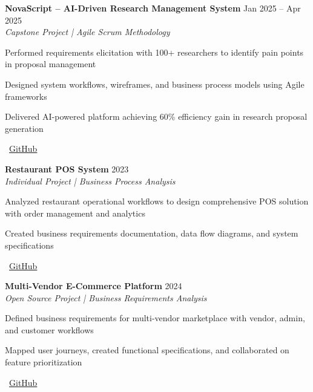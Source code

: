\documentclass[letterpaper,10pt]{article}
\newenvironment{resume_list}{
  \vspace{-2pt}
  \begin{itemize}[itemsep=1pt, leftmargin=14pt]
}{
  \end{itemize}\vspace{-3pt}
}
\begin{document}
\textbf{NovaScript – AI-Driven Research Management System} \hfill Jan 2025 – Apr 2025\\
\textit{Capstone Project | Agile Scrum Methodology}\\
\begin{resume_list}
  \item Performed requirements elicitation with 100+ researchers to identify pain points in proposal management
  \item Designed system workflows, wireframes, and business process models using Agile frameworks
  \item Delivered AI-powered platform achieving 60\% efficiency gain in research proposal generation
  \item \faGithub~\href{https://github.com/Chandima0406/NovaScript.git}{GitHub}
\end{resume_list}

\textbf{Restaurant POS System} \hfill 2023\\
\textit{Individual Project | Business Process Analysis}\\
\begin{resume_list}
  \item Analyzed restaurant operational workflows to design comprehensive POS solution with order management and analytics
  \item Created business requirements documentation, data flow diagrams, and system specifications
  \item \faGithub~\href{https://github.com/vindyakodithuwakku02/pos-system.git}{GitHub}
\end{resume_list}

\textbf{Multi-Vendor E-Commerce Platform} \hfill 2024\\
\textit{Open Source Project | Business Requirements Analysis}\\
\begin{resume_list}
  \item Defined business requirements for multi-vendor marketplace with vendor, admin, and customer workflows
  \item Mapped user journeys, created functional specifications, and collaborated on feature prioritization
  \item \faGithub~\href{https://github.com/vindyakodithuwakku02/gocart.git}{GitHub}
\end{resume_list}
\end{document}
